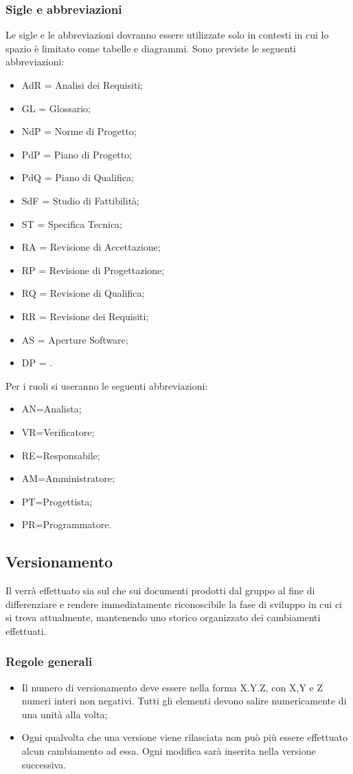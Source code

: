 \subsubsection{Sigle e abbreviazioni}
\label{5.5}
Le sigle e le abbreviazioni dovranno essere utilizzate solo in contesti in cui lo spazio è limitato come tabelle e diagrammi. Sono previste le seguenti abbreviazioni:
\begin{itemize}
\item AdR = Analisi dei Requisiti;
\item GL = Glossario;
\item NdP = Norme di Progetto;
\item PdP = Piano di Progetto;
\item PdQ = Piano di Qualifica;
\item SdF = Studio di Fattibilità;
\item ST = Specifica Tecnica;
\item RA = Revisione di Accettazione;
\item RP = Revisione di Progettazione;
\item RQ = Revisione di Qualifica;
\item RR = Revisione dei Requisiti;
\item AS = Aperture Software;
\item DP = .
\end{itemize}
Per i ruoli si useranno le seguenti abbreviazioni:
\begin{itemize}
\item AN=Analista;
\item VR=Verificatore;
\item RE=Responsabile;
\item AM=Amministratore;
\item PT=Progettista;
\item PR=Programmatore.
\end{itemize}

\newpage
\subsection{Versionamento}
\label{6.0}
Il  verrà effettuato sia sul  che sui documenti prodotti dal gruppo al fine di differenziare e rendere immediatamente riconoscibile la fase di sviluppo in cui ci si trova attualmente, mantenendo uno storico organizzato dei cambiamenti effettuati.

\subsubsection{Regole generali}
\label{6.1}
\begin{itemize}
\item Il numero di versionamento deve essere nella forma X.Y.Z, con X,Y e Z numeri interi non negativi. Tutti gli elementi devono salire numericamente di una unità alla volta;
\item Ogni qualvolta che una versione viene rilasciata non può più essere effettuato alcun cambiamento ad essa. Ogni modifica sarà inserita nella versione successiva.
\end{itemize}

